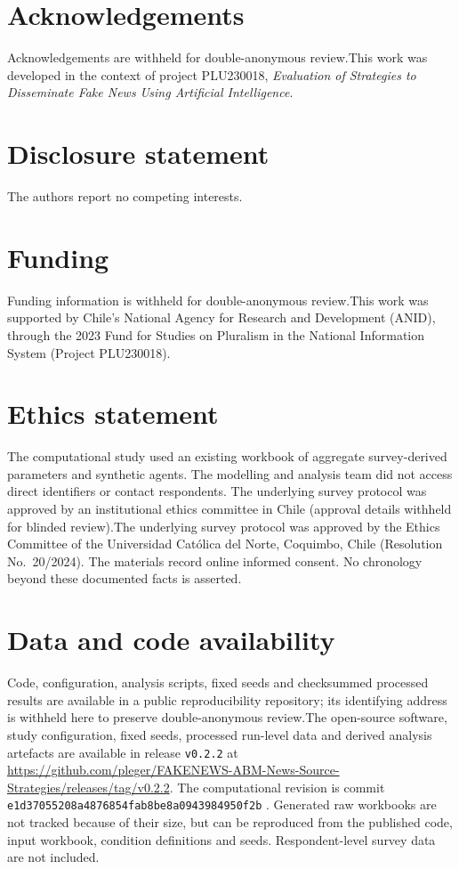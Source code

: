 \section*{Acknowledgements}
\ifdefined\ANONYMOUS Acknowledgements are withheld for double-anonymous review.\else This work was developed in the context of project PLU230018, \textit{Evaluation of Strategies to Disseminate Fake News Using Artificial Intelligence}.\fi

\section*{Disclosure statement}
The authors report no competing interests.

\section*{Funding}
\ifdefined\ANONYMOUS Funding information is withheld for double-anonymous review.\else This work was supported by Chile's National Agency for Research and Development (ANID), through the 2023 Fund for Studies on Pluralism in the National Information System (Project PLU230018).\fi

\section*{Ethics statement}
The computational study used an existing workbook of aggregate survey-derived parameters and synthetic agents. The modelling and analysis team did not access direct identifiers or contact respondents. \ifdefined\ANONYMOUS The underlying survey protocol was approved by an institutional ethics committee in Chile (approval details withheld for blinded review).\else The underlying survey protocol was approved by the Ethics Committee of the Universidad Cat\'olica del Norte, Coquimbo, Chile (Resolution No.~20/2024).\fi{} The materials record online informed consent. No chronology beyond these documented facts is asserted.

\section*{Data and code availability}
\ifdefined\ANONYMOUS Code, configuration, analysis scripts, fixed seeds and checksummed processed results are available in a public reproducibility repository; its identifying address is withheld here to preserve double-anonymous review.\else The open-source software, study configuration, fixed seeds, processed run-level data and derived analysis artefacts are available in release \texttt{v0.2.2} at \url{https://github.com/pleger/FAKENEWS-ABM-News-Source-Strategies/releases/tag/v0.2.2}. The computational revision is commit \texttt{e1d37055208a4876854fab8be8a0943984950f2b} \citep{fakenewsRepository2026}. Generated raw workbooks are not tracked because of their size, but can be reproduced from the published code, input workbook, condition definitions and seeds. Respondent-level survey data are not included.\fi

